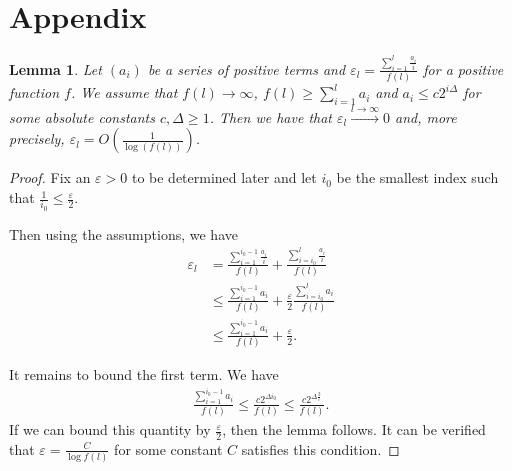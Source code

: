 \documentclass[a4paper,11pt,oneside,english,onecolumn]{article}
\newtheorem{lemma}[theorem]{Lemma}
\theoremstyle{definition}
\newcommand{\bigO}[1]{\ensuremath{O\left( #1 \right)}}
\newcommand{\eps}{\ensuremath{\varepsilon}}
\begin{document}






\section{Appendix}
\label{append}

\begin{lemma}
\label{lemma:series}
Let $(a_i)$ be a series of positive terms and $\eps_l = \frac{\sum_{i=1}^l \frac{a_i}{i}}{f(l)}$ for a positive function $f$. We assume that $f(l) \rightarrow \infty$, $f(l) \geq \sum_{i=1}^l a_i$ and $a_i \leq c2^{i \Delta}$ for some absolute constants $c,\Delta\geq 1$. Then we have that $\eps_l \xrightarrow{l \rightarrow \infty} 0$ and, more precisely, $\eps_l = \bigO{\frac{1}{\log(f(l))}}$.
\end{lemma}
\begin{proof}
Fix an $\eps > 0$ to be determined later and let $i_0$ be the smallest index such that $\frac{1}{i_0} \leq \frac{\eps}{2}$.

Then using the assumptions, we have
\begin{align*}
\eps_l &= \frac{\sum_{i=1}^{i_0 -1} \frac{a_i}{i}}{f(l)} + \frac{\sum_{i=i_0}^l \frac{a_i}{i}}{f(l)} \\
	&\leq  \frac{\sum_{i=1}^{i_0 -1} a_i}{f(l)} + \frac{\eps}{2} \frac{\sum_{i=i_0}^l a_i}{f(l)} \\
	& \leq \frac{\sum_{i=1}^{i_0 -1} a_i}{f(l)}+ \frac{\eps}{2}.
\end{align*}

It remains to bound the first term. We have
\begin{align*}
\frac{\sum_{i=1}^{i_0 -1} a_i}{f(l)} \leq \frac{c 2^{\Delta i_0}}{f(l)} \leq \frac{c 2^{\Delta \frac{3}{\eps}}}{f(l)}.
\end{align*}
If we can bound this quantity by $\frac{\eps}{2}$, then the lemma follows. It can be verified that $\eps = \frac{C}{\log f(l)}$ for some constant $C$ satisfies this condition.
\end{proof}
\end{document}
